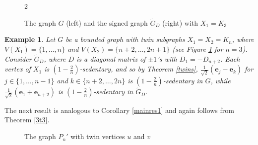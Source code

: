\documentclass[12pt,a4paper]{article}
\newtheorem{exa}{Example}
\def \e {{\bf e}}
\def \e {{\mathbf e}}
\begin{document}
\begin{figure}
\begin{multicols}{2}
\begin{center}
\end{center}	
\end{multicols}
\caption{\label{fig4} The graph $G$ (left) and the signed graph $\tilde{G}_D$ (right) with $X_1=K_3$}
\end{figure}

\begin{exa}
Let $G$ be a bounded graph with twin subgraphs $X_1=X_2=K_n$, where $V(X_1)=\{1,\ldots,n\}$ and $V(X_2)=\{n+2,\ldots,2n+1\}$ (see Figure \ref{fig4} for $n=3$).
Consider $\tilde{G}_D$, where $D$ is a diagonal matrix of $\pm 1$'s with $D_1=-D_{n+2}$. Each vertex of $X_1$ is $(1-\frac{2}{n})$-sedentary, and so by Theorem \ref{twins}, $\frac{1}{\sqrt{2}}(\e_j-\e_k)$ for $j\in\{1,\ldots,n-1\}$ and $k\in\{n+2,\ldots,2n\}$ is $(1-\frac{2}{n})$-sedentary in $G$, while $\frac{1}{\sqrt{2}}(\e_1+\e_{n+2})$ is $(1-\frac{2}{n})$-sedentary in $\tilde{G}_D$.
\end{exa}

The next result is analogous to Corollary \ref{mainres1} and again follows from Theorem \ref{3t3}.

\begin{figure}[h!]\label{fig:small} 
	\begin{center}
	\end{center}
	\caption{The graph $P_n'$ with twin vertices $u$ and $v$}\label{yay}
\end{figure}
\end{document}
